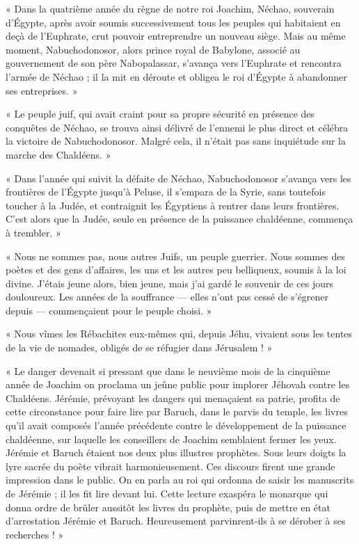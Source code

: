 \documentclass[a4paper, 11pt, oneside, polutonikogreek, french]{article}
\begin{document}
\bigskip
\centerline{\EightStarTaper}
\centerline{\EightStarTaper\EightStarTaper}
\bigskip

« Dans la quatrième année du règne de notre roi Joachim, Néchao, souverain d'Égypte, après avoir soumis successivement tous les peuples qui habitaient en deçà de l'Euphrate, crut pouvoir entreprendre un nouveau siège. Mais au même moment, Nabuchodonosor, alors prince royal de Babylone, associé au gouvernement de son père Nabopalassar, s'avança vers l'Euphrate et rencontra l'armée de Néchao ; il la mit en déroute et obligea le roi d'Égypte à abandonner ses entreprises. »

« Le peuple juif, qui avait craint pour sa propre sécurité en présence des conquêtes de Néchao, se trouva ainsi délivré de l'ennemi le plus direct et célébra la victoire de Nabuchodonosor. Malgré cela, il n'était pas sans inquiétude sur la marche des Chaldéens. »

« Dans l'année qui suivit la défaite de Néchao, Nabuchodonosor s'avança vers les frontières de l'Égypte jusqu'à Peluse, il s'empara de la Syrie, sans toutefois toucher à la Judée, et contraignit les Égyptiens à rentrer dans leurs frontières. C'est alors que la Judée, seule en présence de la puissance chaldéenne, commença à trembler. »

\bigskip
\centerline{\EightStarTaper}
\centerline{\EightStarTaper\EightStarTaper}
\bigskip

« Nous ne sommes pas, nous autres Juifs, un peuple guerrier. Nous sommes des poètes et des gens d'affaires, les uns et les autres peu belliqueux, soumis à la loi divine. J'étais jeune alors, bien jeune, mais j'ai gardé le souvenir de ces jours douloureux. Les années de la souffrance --- elles n'ont pas cessé de s'égrener depuis --- commençaient pour le peuple choisi. »

« Nous vîmes les Rébachites eux-mêmes qui, depuis Jéhu, vivaient sous les tentes de la vie de nomades, obligés de se réfugier dans Jérusalem ! »

« Le danger devenait si pressant que dans le neuvième mois de la cinquième année de Joachim on proclama un jeûne public pour implorer Jéhovah contre les Chaldéens. Jérémie, prévoyant les dangers qui menaçaient sa patrie, profita de cette circonstance pour faire lire par Baruch, dans le parvis du temple, les livres qu'il avait composés l'année précédente contre le développement de la puissance chaldéenne, sur laquelle les conseillers de Joachim semblaient fermer les yeux. Jérémie et Baruch étaient nos deux plus illustres prophètes. Sous leurs doigts la lyre sacrée du poète vibrait harmonieusement. Ces discours firent une grande impression dans le public. On en parla au roi qui ordonna de saisir les manuscrits de Jérémie ; il les fit lire devant lui. Cette lecture exaspéra le monarque qui donna ordre de brûler aussitôt les livres du prophète, puis de mettre en état d'arrestation Jérémie et Baruch. Heureusement parvinrent-ils à se dérober à ses recherches ! »
\end{document}

